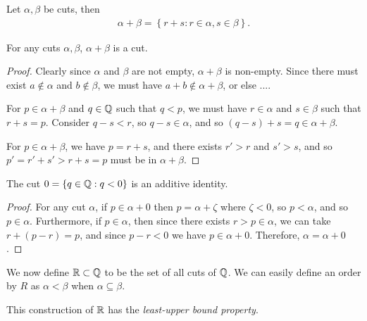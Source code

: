 \begin{defn}
    Let $\alpha, \beta$ be cuts, then
    \begin{align*}
        \alpha + \beta = \left\{r + s : r \in \alpha, s \in \beta\right\}.
    \end{align*}
\end{defn}

\begin{prop}
    For any cuts $\alpha, \beta$, $\alpha+\beta$ is a cut.
\end{prop}

\begin{proof}
    Clearly since $\alpha$ and $\beta$ are not empty, $\alpha+\beta$ is non-empty. Since there must exist $a \not\in \alpha$ and $b \not\in \beta$, we must have $a+b\not\in \alpha+\beta$, or else ....

    For $p \in \alpha+\beta$ and $q \in \mathbb{Q}$ such that $q < p$, we must have $r\in\alpha$ and $s\in\beta$ such that $r+s = p$. Consider $q - s < r$, so $q-s \in\alpha$, and so $(q-s)+s = q \in \alpha+\beta$.

    For $p \in \alpha+\beta$, we have $p = r+s$, and there exists $r'>r$ and $s'>s$, and so $p' = r'+s' > r+s = p$ must be in $\alpha+\beta$.
\end{proof}

\begin{prop}
    The cut $0 = \{q \in \mathbb{Q} : q < 0\}$ is an additive identity.
\end{prop}

\begin{proof}
    For any cut $\alpha$, if $p \in \alpha+0$ then $p = \alpha + \zeta$ where $\zeta < 0$, so $p < \alpha$, and so $p \in \alpha$. Furthermore, if $p \in \alpha$, then since there exists $r > p \in \alpha$, we can take $r + (p - r) = p$, and since $p - r < 0$ we have $p \in \alpha + 0$. Therefore, $\alpha = \alpha + 0$.
\end{proof}

We now define $\mathbb{R} \subset \mathbb{Q}$ to be the set of all cuts of $\mathbb{Q}$. We can easily define an order by $R$ as $\alpha < \beta$ when $\alpha \subseteq \beta$.

\begin{thm}
    This construction of $\mathbb{R}$ has the \emph{least-upper bound property}.
\end{thm}

